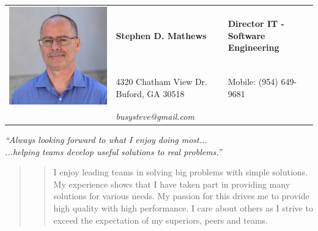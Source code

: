 \documentclass[10pt]{report}
\begin{document}
{
\setlength{\arrayrulewidth}{.4em}

\noindent
\begin{table}
\begin{tabular}{ L{5em} L{.5\textwidth}  R{.35\textwidth} }
\hline
{}
& \textbf{Stephen D. Mathews} & \textbf{Director IT - Software Engineering} \\
& 4320 Chatham View Dr. Buford, GA 30518 & Mobile: (954) 649-9681 \\
& \textsl{busysteve@gmail.com} &   \\
\hline
\end{tabular}
	\center
	\textsl{``Always looking forward to what I enjoy doing most...} \\
	\textsl{...helping teams develop useful solutions to real problems.''}
	\begin{quote}
		\begin{quote}
			I enjoy leading teams in solving big problems with simple solutions.  My experience shows that I have taken part in providing many solutions for various needs.  My passion for this drives me to provide high quality with high performance.  I care about others as I strive to exceed the expectation of my superiors, peers and teams.
		\end{quote}
	\end{quote}
\end{table}
}


\end{document}
